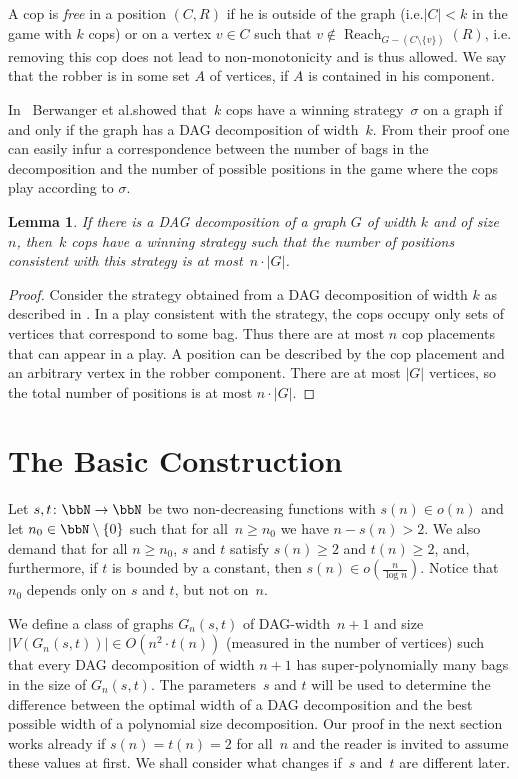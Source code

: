 \documentclass[authoryear]{article}
\makeatletter
\newtheorem{lemma}[theorem]{Lemma}
\theoremstyle{definition}
\DeclareMathOperator{\Reach}{Reach}
\newcommand{\0}{\emptyset}
\newcommand{\dagw}{DAG-{}width\xspace}
\newcommand{\ie}{i.e.\@\xspace}
\makeatother
\begin{document}
A cop is \emph{free} in a position $(C,R)$ if he is outside of the
graph (\ie $|C|<k$ in the game with $k$ cops) or on 
a vertex $v\in C$ such that $v\notin \Reach_{G-(C\setminus \{v\})}(R)$, \ie 
removing this cop does not lead to non-monotonicity and is thus allowed. We say
that the robber is in some set $A$ of vertices, if $A$ is contained in his component.



In~\cite{BerwangerDawHunKreObd12} Berwanger et al.\@ showed that~$k$
cops have a winning strategy~$\sigma$ on a graph if and only if the graph has a
DAG decomposition of width~$k$. From their proof one can easily infur
a correspondence between the number of bags in the decomposition and
the number of possible positions in the game where the cops play
according to $\sigma$.

\begin{lemma}\label{lemma:decs_and_positions}
If there is a DAG decomposition of a graph $G$ of width $k$ and of
size $n$, then~$k$ cops have a winning strategy such that the number
of positions consistent with this strategy is at most~$n\cdot |G|$.
\end{lemma}
\begin{proof}
  Consider the strategy obtained from a DAG
  decomposition of width $k$ as described in \cite[Theorem
  16]{BerwangerDawHunKreObd12}. In a play consistent with the strategy, the
  cops occupy only sets of vertices that correspond to some bag. Thus
  there are at most $n$ cop placements that can appear in a play. A
  position can be described by the cop placement and  an arbitrary vertex in the robber
  component. There are at most $|G|$ vertices, so the total number of
  positions is at most $n\cdot |G|$.
\end{proof}


\section{The Basic Construction}\label{sec:constr}

Let $s,t\colon \bbN \to \bbN$ be two non-decreasing
functions with $s(n) \in o(n)$ and let $n_0 \in \bbN\setminus\{0\}$
such that for all~$n\ge n_0$ we have $n-s(n)>2$. We also demand that
for all $n\ge n_0$, $s$ and $t$ satisfy $s(n)\ge 2$ and  $t(n)\ge 2$, and,
furthermore, if $t$ is bounded by a constant, then
$s(n)\in o(\frac{n}{\log n})$. Notice that $n_0$ depends only on $s$ and $t$, but not on~$n$.

We define a class of graphs $G_n(s,t)$ of \dagw~$n+1$ and size
$|V(G_n(s,t))| \in O(n^2\cdot t(n))$ (measured in the number of vertices)
such that every DAG decomposition of width $n+1$ has
super-polynomially many bags in the size of $G_n(s,t)$. The
parameters~$s$ and $t$ will be used to determine the difference
between the optimal width of a DAG decomposition and the best possible
width of a polynomial size decomposition. Our proof in the next section works already if
$s(n) = t(n) = 2$ for all~$n$ and the reader is invited to assume
these values at first. We shall consider what changes if~$s$ and~$t$
are different later.
\end{document}
